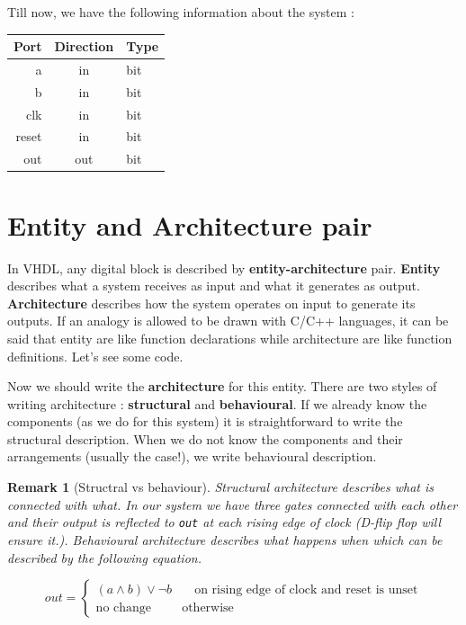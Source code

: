 \documentclass[a4paper,10pt]{article}
\newtheorem{remark}{Remark}
\begin{document}
  Till now, we have the following information about the system :

    \begin{tabular}{r c l} 
      Port & Direction & Type \\
      \hline a & in & bit \\ 
      b & in & bit \\ 
      clk & in & bit \\ 
      reset & in & bit \\
      out & out & bit \\ 
    \hline 
  \end{tabular} 


\section{Entity and Architecture pair}
  
In VHDL, any digital block is described by \textbf{entity-architecture} pair.
\textbf{Entity} describes what a system receives as input and what it generates
as output. \textbf{Architecture} describes how the system operates on input to
generate its outputs. If an analogy is allowed to be drawn with C/C++ languages,
it can be said that entity are like function declarations while architecture are
like function definitions. Let's see some code.



Now we should write the \textbf{architecture} for this entity. There are two
styles of writing architecture : \textbf{structural} and \textbf{behavioural}.
If we already know the components (as we do for this system) it is
straightforward to write the structural description. When we do not know the
components and their arrangements (usually the case!), we write behavioural
description. 

\begin{remark}[Structral vs behaviour]
 
  Structural architecture describes \emph{what is connected with what}. In our
  system we have three gates connected with each other and their output is
  reflected to \texttt{out} at each rising edge of clock (D-flip flop will
  ensure it.). Behavioural architecture describes \emph{what happens when}
  which can be described by the following equation.

  \begin{equation} out = \begin{cases} (a \land b) \lor \neg b & \quad \text{on
    rising edge of clock and reset is unset}\\ \text{no change} &
    \text{otherwise} \end{cases} \end{equation} \end{remark}
\end{document}
